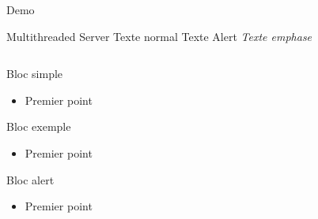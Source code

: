 \documentclass{bredelebeamer}
\begin{document}
    \begin{frame}{Demo}
    \end{frame}



    \begin{frame}{Multithreaded Server}
        Texte normal \alert{Texte Alert}   \emph{Texte emphase}

        \begin{columns}

            \begin{column}{0.5\textwidth}
                \begin{block}{Bloc simple}
                    \begin{itemize}
                        \item Premier point
                    \end{itemize}
                \end{block}

                \begin{exampleblock}{Bloc exemple}
                    \begin{itemize}
                        \item Premier point
                    \end{itemize}
                \end{exampleblock}

                \begin{alertblock}{Bloc alert}
                    \begin{itemize}
                        \item Premier point
                    \end{itemize}
                \end{alertblock}

            \end{column}

            \begin{column}{0.5\textwidth}






\end{column}
\end{columns}
\end{frame}
\end{document}

